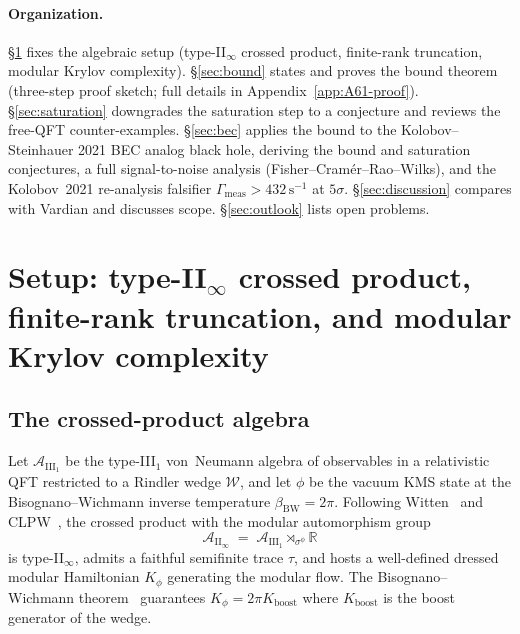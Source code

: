 \documentclass[12pt,a4paper]{article}
\begin{document}
\paragraph{Organization.}
\S\ref{sec:setup} fixes the algebraic setup (type-II$_\infty$ crossed
product, finite-rank truncation, modular Krylov complexity).
\S\ref{sec:bound} states and proves the bound theorem (three-step proof
sketch; full details in Appendix~\ref{app:A61-proof}).
\S\ref{sec:saturation} downgrades the saturation step to a conjecture
and reviews the free-QFT counter-examples.
\S\ref{sec:bec} applies the bound to the Kolobov--Steinhauer 2021
BEC analog black hole, deriving the bound and saturation conjectures,
a full signal-to-noise analysis (Fisher--Cram\'{e}r--Rao--Wilks),
and the Kolobov~2021 re-analysis falsifier
$\Gamma_{\mathrm{meas}} > 432\,\mathrm{s}^{-1}$ at $5\sigma$.
\S\ref{sec:discussion} compares with Vardian and discusses scope.
\S\ref{sec:outlook} lists open problems.

\section{Setup: type-II$_\infty$ crossed product, finite-rank truncation,
         and modular Krylov complexity}
\label{sec:setup}

\subsection{The crossed-product algebra}

Let $\mathcal{A}_{\mathrm{III}_1}$ be the type-III$_1$ von~Neumann
algebra of observables in a relativistic QFT restricted to a Rindler
wedge $\mathcal{W}$, and let $\phi$ be the vacuum KMS state at the
Bisognano--Wichmann inverse temperature $\beta_{\mathrm{BW}} = 2\pi$.
Following Witten~\cite{Witten2022} and CLPW~\cite{CLPW2023}, the
crossed product with the modular automorphism group
\begin{equation}
  \mathcal{A}_{\mathrm{II}_\infty}
  \;=\;
  \mathcal{A}_{\mathrm{III}_1} \rtimes_{\sigma^\phi} \mathbb{R}
  \label{eq:crossed}
\end{equation}
is type-II$_\infty$, admits a faithful semifinite trace $\tau$, and
hosts a well-defined dressed modular Hamiltonian $K_\phi$ generating
the modular flow.
The Bisognano--Wichmann theorem~\cite{BisognanoWichmann1976} guarantees
$K_\phi = 2\pi K_{\mathrm{boost}}$ where $K_{\mathrm{boost}}$ is the
boost generator of the wedge.
\end{document}
